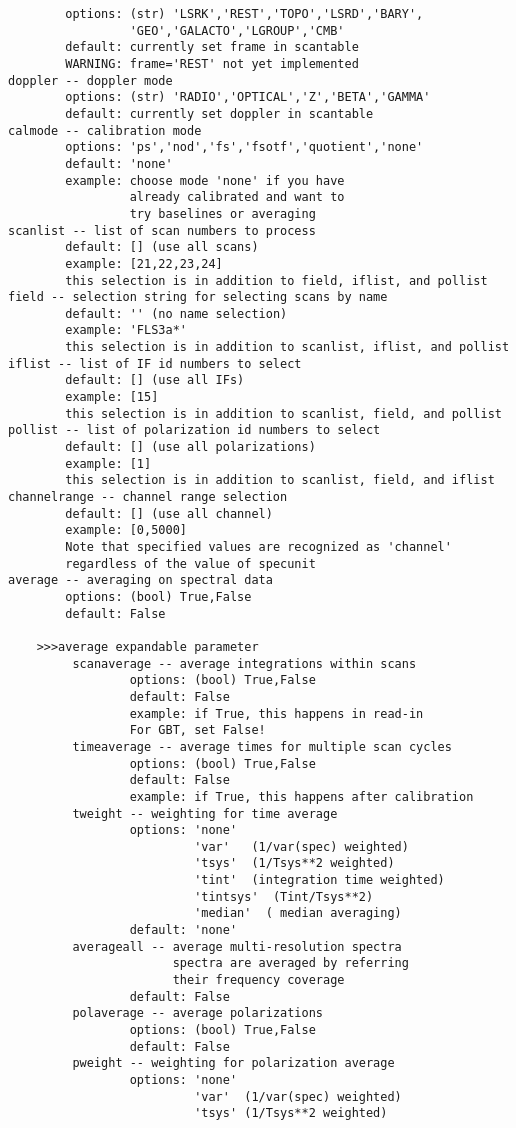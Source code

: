 \begin{verbatim}
        options: (str) 'LSRK','REST','TOPO','LSRD','BARY',
                 'GEO','GALACTO','LGROUP','CMB'
        default: currently set frame in scantable
        WARNING: frame='REST' not yet implemented
doppler -- doppler mode
        options: (str) 'RADIO','OPTICAL','Z','BETA','GAMMA'
        default: currently set doppler in scantable
calmode -- calibration mode
        options: 'ps','nod','fs','fsotf','quotient','none'
        default: 'none'
        example: choose mode 'none' if you have
                 already calibrated and want to
                 try baselines or averaging
scanlist -- list of scan numbers to process
        default: [] (use all scans)
        example: [21,22,23,24]
        this selection is in addition to field, iflist, and pollist
field -- selection string for selecting scans by name
        default: '' (no name selection)
        example: 'FLS3a*'
        this selection is in addition to scanlist, iflist, and pollist
iflist -- list of IF id numbers to select
        default: [] (use all IFs)
        example: [15]
        this selection is in addition to scanlist, field, and pollist
pollist -- list of polarization id numbers to select
        default: [] (use all polarizations)
        example: [1]
        this selection is in addition to scanlist, field, and iflist
channelrange -- channel range selection
        default: [] (use all channel)
        example: [0,5000]
        Note that specified values are recognized as 'channel' 
        regardless of the value of specunit 
average -- averaging on spectral data 
        options: (bool) True,False
        default: False

    >>>average expandable parameter
         scanaverage -- average integrations within scans
                 options: (bool) True,False
                 default: False
                 example: if True, this happens in read-in
                 For GBT, set False!
         timeaverage -- average times for multiple scan cycles
                 options: (bool) True,False
                 default: False
                 example: if True, this happens after calibration
         tweight -- weighting for time average
                 options: 'none'
                          'var'   (1/var(spec) weighted)
                          'tsys'  (1/Tsys**2 weighted)
                          'tint'  (integration time weighted)
                          'tintsys'  (Tint/Tsys**2)
                          'median'  ( median averaging)
                 default: 'none'
         averageall -- average multi-resolution spectra
                       spectra are averaged by referring 
                       their frequency coverage
                 default: False
         polaverage -- average polarizations
                 options: (bool) True,False
                 default: False
         pweight -- weighting for polarization average
                 options: 'none'
                          'var'  (1/var(spec) weighted)
                          'tsys' (1/Tsys**2 weighted)


\end{verbatim}
